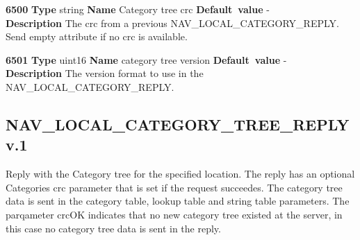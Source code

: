 \documentclass[a4paper]{article}
\begin{document}
\begin{list}{\textbf{ParamID}}{}
\item \textbf{6500} \textbf{Type} string \textbf{Name} Category tree crc
                 \textbf{Default~value} - \\
  \textbf{Description} The crc from a previous NAV\_LOCAL\_CATEGORY\_REPLY. Send 
empty attribute if no crc is available.

\item \textbf{6501} \textbf{Type} uint16 \textbf{Name} category tree version
                 \textbf{Default~value} - \\
  \textbf{Description} The version format to use in the NAV\_LOCAL\_CATEGORY\_REPLY.

\end{list}

\subsection{NAV\_LOCAL\_CATEGORY\_TREE\_REPLY v.1}

Reply with the Category tree for the specified location. The reply has an 
optional Categories crc parameter that is set if the request succeedes.
The category tree data is sent in the category table, lookup table and string 
table parameters. The parqameter crcOK indicates that no new category tree 
existed at the server, in this case no category tree data is sent in the reply.
\end{document}
